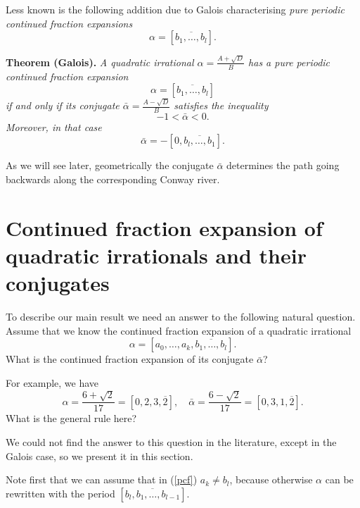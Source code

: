 \documentclass[11pt,reqno]{amsart}
\newtheorem{Theorem}{Theorem}
\begin{document}
Less known is the following addition due to Galois \cite{Galois} characterising {\it pure periodic continued fraction expansions}
$$
\alpha=[\overline{b_1, \ldots, b_l}].
$$


{\bf Theorem (Galois).} {\it A quadratic irrational $\alpha=\frac{A+\sqrt{D}}{B}$ has a pure periodic continued fraction expansion
\begin{equation*}
\alpha =[\overline{b_1, \ldots, b_l}]
\end{equation*}
if and only if its conjugate
$\bar \alpha=\frac{A-\sqrt{D}}{B}$
satisfies the inequality
$$
-1<\bar \alpha<0.
$$
Moreover, in that case}
\begin{equation*}
\bar\alpha = - [0, \overline{b_l, \ldots, b_1}].
\end{equation*}

As we will see later, geometrically the conjugate $\bar\alpha$ determines the path going backwards along the corresponding Conway river. 


\section{Continued fraction expansion of quadratic irrationals and their conjugates}

To describe our main result we need an answer to the following natural question.
Assume that we know the continued fraction expansion of a quadratic irrational
\begin{equation}
\label{pcf}
\alpha=[a_0,\dots, a_k, \overline{b_1, \ldots, b_l}].
\end{equation}
What is the continued fraction expansion of its conjugate $\bar\alpha$?

For example, we have 
\begin{equation}
\label{ex1}
\alpha=\frac{6+\sqrt{2}}{17}=[0,2,3,\overline{2}], \quad \bar\alpha=\frac{6-\sqrt{2}}{17}=[0,3,1,\overline{2}].
\end{equation}
What is the general rule here?

We could not find the answer to this question in the literature, except in the Galois case, so we present it in this section.

Note first that we can assume that in (\ref{pcf}) $a_k \neq b_l$, because otherwise $\alpha$ can be rewritten with the period $[\overline{b_l, b_1, \ldots, b_{l-1}}]$.
\end{document}
